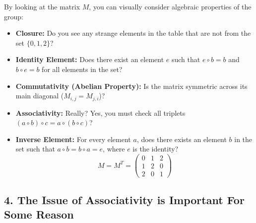 \documentclass{ximera}
\begin{document}
By looking at the matrix $M$, you can visually consider algebraic properties of the group:
\begin{itemize}
    \item \textbf{Closure:} Do you see any strange elements in the table that are not from the set  $\{0, 1, 2\}$?
    \item \textbf{Identity Element:} Does there exist an element $e$ such that $e \circ b = b$ and $ b\circ e = b$ for all elements in the set?
    \item \textbf{Commutativity (Abelian Property):} Is the matrix symmetric across its main diagonal ($M_{i,j} = M_{j,i}$)?
    \item \textbf{Associativity:} Really? Yes, you must check all triplets $(a\circ b) \circ c = a \circ (b \circ c)$?
    \item \textbf{Inverse Element:} For every element $a$, does there exists an element $b$ in the set such that $a \circ b = b \circ a = e$, where $e$ is the identity?
    \[
    M = M^T = \begin{pmatrix}
    0 & 1 & 2 \\
    1 & 2 & 0 \\
    2 & 0 & 1
    \end{pmatrix}
    \]
\end{itemize}

\subsection*{4. The Issue of Associativity is Important For Some Reason}
\end{document}
